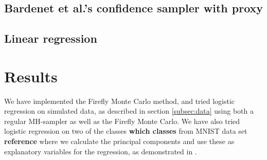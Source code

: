 \subsection{Bardenet et al.'s confidence sampler with proxy}





\subsection{Linear regression}

\section*{Results}
We have implemented the Firefly Monte Carlo method, and tried logistic regression on simulated data, as described in section \ref{subsec:data} using both a regular MH-sampler as well as the Firefly Monte Carlo. 
We have also tried logistic regression on two of the classes \textbf{which classes} from MNIST data set \textbf{reference} where we calculate the principal components and use these as explanatory variables for the regression, as demonstrated in \cite{Maclaurin:1}. 
